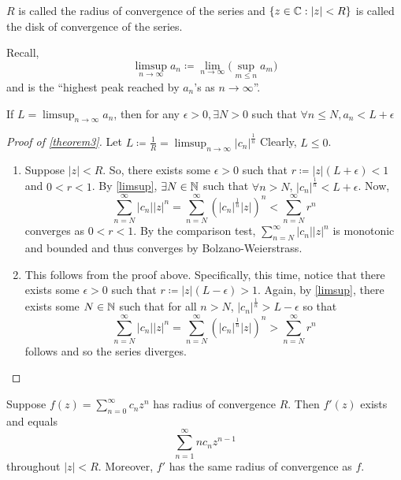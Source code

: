 \documentclass[11pt]{article}
\begin{document}
\begin{remark}
$R$ is called the radius of convergence of the series and $\{z \in \mathbb{C}:|z| < R\}$
is called the disk of convergence of the series.
\end{remark}
\begin{remark}
Recall, $$\limsup_{n\to\infty} a_n \coloneqq \lim_{n\to\infty}\bigg(
\sup_{m\leq n} a_m\bigg)$$
and is the ``highest peak reached by $a_n$'s as $n \to \infty$''.
\end{remark}
\begin{prop}
If $L = \limsup_{n\to\infty}a_n$, then for any $\epsilon > 0, \exists N > 0$
such that $\forall n \leq N, a_n < L + \epsilon$
\label{limsup}
\end{prop}
\begin{proof}[Proof of \cref{theorem3}]
Let $\displaystyle L \coloneqq \frac{1}{R} = \limsup_{n \to
\infty} |c_n|^\frac{1}{n}$ Clearly, $L \leq 0$.
\begin{enumerate}
\item
Suppose $|z| < R$. So, there exists some $\epsilon > 0$ such that $r \coloneqq
|z|(L + \epsilon) < 1$ and $0 < r < 1$. By \cref{limsup}, $\exists N \in \mathbb{N}$
such that $\forall n > N$, $|c_n|^{\frac{1}{n}} < L+\epsilon$. Now,
\begin{equation*}
\sum^\infty_{n = N}|c_n||z|^n = \sum^\infty_{n=N}\left(|c_n|^{\frac{1}{n}}|z|
\right)^n < \sum^\infty_{n=N}r^n
\end{equation*}
converges as $0<r<1$. By the comparison test, $\sum^\infty_{n = N}|c_n||z|^n$ is
monotonic and bounded and thus converges by Bolzano-Weierstrass.
\item
This follows from the proof above. Specifically, this time, notice that there
exists some $\epsilon > 0$ such that $r \coloneqq |z|(L - \epsilon) > 1$. Again,
by \cref{limsup}, there exists some $N \in \mathbb{N}$ such that for all $n > N$,
$|c_n|^{\frac{1}{n}} > L - \epsilon$ so that
\begin{equation*}
\sum^\infty_{n = N}|c_n||z|^n = \sum^\infty_{n=N}\left(|c_n|^{\frac{1}{n}}|z|
\right)^n > \sum^\infty_{n=N}r^n
\end{equation*}
follows and so the series diverges.
\end{enumerate}
\end{proof}
\begin{theorem}
Suppose $\displaystyle f(z) = \sum^\infty_{n=0}c_nz^n$ has radius of
convergence $R$. Then $f'(z)$ exists and equals
\begin{equation*}
\sum^{\infty}_{n=1} nc_nz^{n-1}
\end{equation*}
throughout $|z| < R$. Moreover, $f'$ has the same radius of convergence as $f$.
\label{theorem4}
\end{theorem}
\end{document}

